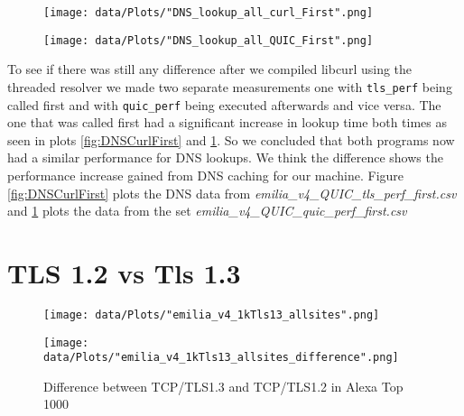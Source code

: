 \begin{figure}[!thb]
	\centering
	\begin{minipage}{.45\textwidth}
		\centering
		\texttt{[image: data/Plots/"DNS\_lookup\_all\_curl\_First".png]}
  		\label{fig:DNSCurlFirst}
  	\end{minipage}%
  	\hspace{0.5cm}
  	\begin{minipage}{.45\textwidth}
  		\centering 
  		\texttt{[image: data/Plots/"DNS\_lookup\_all\_QUIC\_First".png]}
  		\label{fig:DNSLSQUICFirst} 	
  	\end{minipage}
\end{figure}

To see if there was still any difference after we compiled libcurl using the threaded resolver we made two separate measurements one with \texttt{tls\_perf} being called first and with \texttt{quic\_perf} being executed afterwards and vice versa.
The one that was called first had a significant increase in lookup time both times as seen in plots \ref{fig:DNSCurlFirst} and \ref{fig:DNSLSQUICFirst}.
So we concluded that both programs now had a similar performance for DNS lookups.
We think the difference shows the performance increase gained from DNS caching for our machine. 
Figure \ref{fig:DNSCurlFirst} plots the DNS data from \textit{emilia\_v4\_QUIC\_tls\_perf\_first.csv} and \ref{fig:DNSLSQUICFirst} plots the data from the set \textit{emilia\_v4\_QUIC\_quic\_perf\_first.csv}

\section{TLS 1.2 vs Tls 1.3}
\label{section:TLS1_1.2_vs_Tls_1.3}

\begin{figure}[!thb]
	\centering
	\begin{minipage}{.45\textwidth}
		\centering
		\texttt{[image: data/Plots/"emilia\_v4\_1kTls13\_allsites".png]}
		\caption{Latency of 107 sites in Alexa Top 1000 that support TLS 1.3}
  		\label{fig:LatencyTLS13Top1k}
  	\end{minipage}%
  	\hspace{0.5cm}
  	\begin{minipage}{.45\textwidth}
  		\centering
  		\texttt{[image: data/Plots/"emilia\_v4\_1kTls13\_allsites\_difference".png]}
		\caption{Difference between TCP/TLS1.3 and TCP/TLS1.2 in Alexa Top 1000}
  		\label{fig:DiffTls13Tls12}
  	\end{minipage}
\end{figure}

